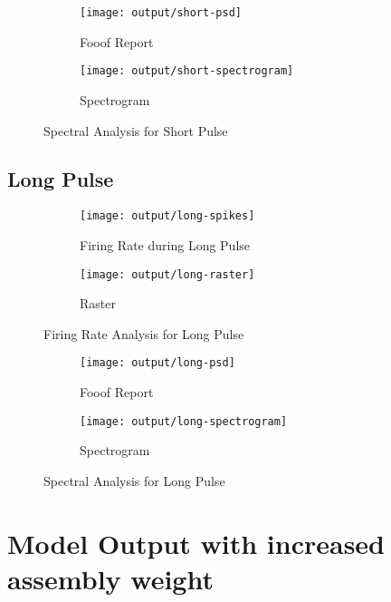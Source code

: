 \documentclass[12pt, letterpaper]{article}
\begin{document}
\begin{figure}[H]
    \centering
    \begin{subfigure}{.75\textwidth}
      \centering
      \texttt{[image: output/short-psd]}
      \caption{Fooof Report}
      \label{fig:short-psd}
    \end{subfigure}
    \begin{subfigure}{.75\textwidth}
      \centering
      \texttt{[image: output/short-spectrogram]}
      \caption{Spectrogram}
      \label{fig:short-spectrogram}
    \end{subfigure}
    \caption{Spectral Analysis for Short Pulse}
\end{figure}

\subsection*{Long Pulse}

\begin{figure}[H]
  \centering
  \begin{subfigure}{\textwidth}
    \centering
    \texttt{[image: output/long-spikes]}
    \caption{Firing Rate during Long Pulse}
    \label{fig:long-spikes}
  \end{subfigure}
  \begin{subfigure}{\textwidth}
    \centering
    \texttt{[image: output/long-raster]}
    \caption{Raster}
    \label{fig:long-raster}
  \end{subfigure}
  \caption{Firing Rate Analysis for Long Pulse}
\end{figure}

\begin{figure}[H]
    \centering
    \begin{subfigure}{.75\textwidth}
      \centering
      \texttt{[image: output/long-psd]}
      \caption{Fooof Report}
      \label{fig:long-psd}
    \end{subfigure}
    \begin{subfigure}{.75\textwidth}
      \centering
      \texttt{[image: output/long-spectrogram]}
      \caption{Spectrogram}
      \label{fig:long-spectrogram}
    \end{subfigure}
    \caption{Spectral Analysis for Long Pulse}
\end{figure}


\section*{Model Output with increased assembly weight}
\end{document}
